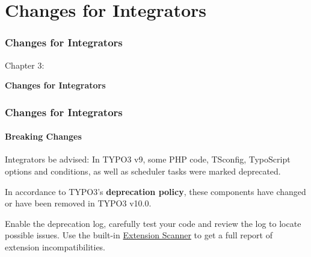 %

\section{Changes for Integrators}
\begin{frame}[fragile]
	\frametitle{Changes for Integrators}

	\begin{center}\huge{Chapter 3:}\end{center}
	\begin{center}\huge{\color{typo3darkgrey}\textbf{Changes for Integrators}}\end{center}

\end{frame}


\begin{frame}[fragile]
	\frametitle{Changes for Integrators}
	\framesubtitle{Breaking Changes}

	\small
		Integrators be advised: In TYPO3 v9, some PHP code, TSconfig, TypoScript
		options and conditions, as well as scheduler tasks were marked deprecated.

		\vspace{0.2cm}

		In accordance to TYPO3's \textbf{deprecation policy}, these components have
		changed or have been removed in TYPO3 v10.0.

		\vspace{0.2cm}

		Enable the deprecation log, carefully test your code and review the log to
		locate possible issues. Use the built-in
		\href{https://docs.typo3.org/m/typo3/reference-coreapi/master/en-us/ApiOverview/ExtensionScanner/Index.html}{Extension Scanner}
		to get a full report of extension incompatibilities.

	\normalsize

\end{frame}


